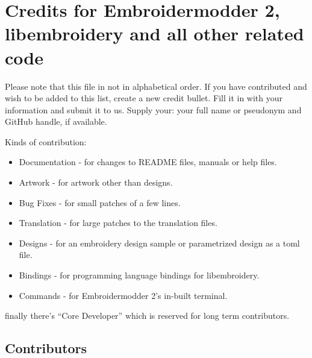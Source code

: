 
\hypertarget{credits-for-embroidermodder-2-libembroidery-and-all-other-related-code}{%
\section{Credits for Embroidermodder 2, libembroidery and all other
related
code}\label{credits-for-embroidermodder-2-libembroidery-and-all-other-related-code}}

Please note that this file in not in alphabetical order. If you have
contributed and wish to be added to this list, create a new credit
bullet. Fill it in with your information and submit it to us. Supply
your: your full name or pseudonym and GitHub handle, if available.

Kinds of contribution:

\begin{itemize}
\item
  Documentation - for changes to README files, manuals or help files.
\item
  Artwork - for artwork other than designs.
\item
  Bug Fixes - for small patches of a few lines.
\item
  Translation - for large patches to the translation files.
\item
  Designs - for an embroidery design sample or parametrized design as a
  toml file.
\item
  Bindings - for programming language bindings for libembroidery.
\item
  Commands - for Embroidermodder 2's in-built terminal.
\end{itemize}

finally there's ``Core Developer'' which is reserved for long term
contributors.

\hypertarget{contributors}{%
\subsection{Contributors}\label{contributors}}


